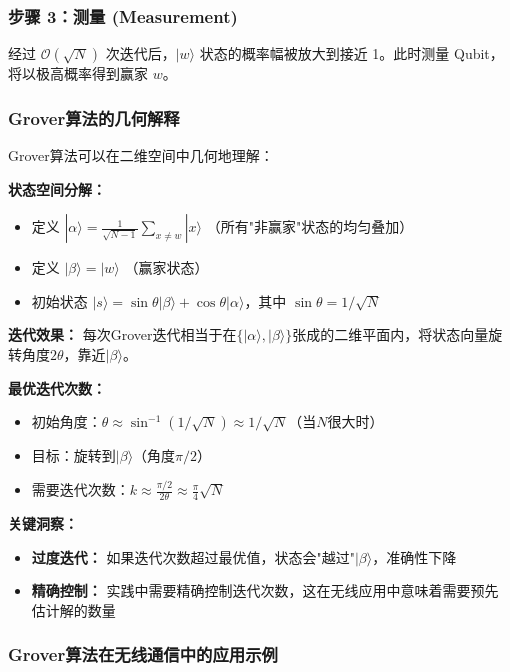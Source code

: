 \documentclass[11pt,a4paper]{article}
\begin{document}
\subsubsection{步骤 3：测量 (Measurement)}

经过 $\mathcal{O}(\sqrt{N})$ 次迭代后，$|w\rangle$ 状态的概率幅被放大到接近 1。此时测量 Qubit，将以极高概率得到赢家 $w$。

\subsubsection{Grover算法的几何解释}

Grover算法可以在二维空间中几何地理解：

\textbf{状态空间分解：}
\begin{itemize}
\item 定义 $|\alpha\rangle = \frac{1}{\sqrt{N-1}}\sum_{x \neq w}|x\rangle$ （所有"非赢家"状态的均匀叠加）
\item 定义 $|\beta\rangle = |w\rangle$ （赢家状态）
\item 初始状态 $|s\rangle = \sin\theta|\beta\rangle + \cos\theta|\alpha\rangle$，其中 $\sin\theta = 1/\sqrt{N}$
\end{itemize}

\textbf{迭代效果：}
每次Grover迭代相当于在$\{|\alpha\rangle, |\beta\rangle\}$张成的二维平面内，将状态向量旋转角度$2\theta$，靠近$|\beta\rangle$。

\textbf{最优迭代次数：}
\begin{itemize}
\item 初始角度：$\theta \approx \sin^{-1}(1/\sqrt{N}) \approx 1/\sqrt{N}$（当$N$很大时）
\item 目标：旋转到$|\beta\rangle$（角度$\pi/2$）
\item 需要迭代次数：$k \approx \frac{\pi/2}{2\theta} \approx \frac{\pi}{4}\sqrt{N}$
\end{itemize}

\textbf{关键洞察：}
\begin{itemize}
\item \textbf{过度迭代：} 如果迭代次数超过最优值，状态会"越过"$|\beta\rangle$，准确性下降
\item \textbf{精确控制：} 实践中需要精确控制迭代次数，这在无线应用中意味着需要预先估计解的数量
\end{itemize}

\subsubsection{Grover算法在无线通信中的应用示例}
\end{document}
